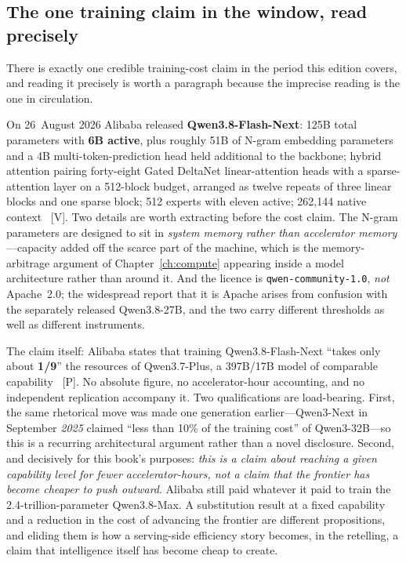 \subsection{The one training claim in the window, read precisely}

There is exactly one credible training-cost claim in the period this edition covers, and reading it precisely is worth a paragraph because the imprecise reading is the one in circulation.

On 26~August 2026 Alibaba released \textbf{Qwen3.8-Flash-Next}: 125B total parameters with \textbf{6B active}, plus roughly 51B of N-gram embedding parameters and a 4B multi-token-prediction head held additional to the backbone; hybrid attention pairing forty-eight Gated DeltaNet linear-attention heads with a sparse-attention layer on a 512-block budget, arranged as twelve repeats of three linear blocks and one sparse block; 512 experts with eleven active; 262,144 native context~\cite{qwen38-flash-next} [V]. Two details are worth extracting before the cost claim. The N-gram parameters are designed to sit in \emph{system memory rather than accelerator memory}---capacity added off the scarce part of the machine, which is the memory-arbitrage argument of Chapter~\ref{ch:compute} appearing inside a model architecture rather than around it. And the licence is \texttt{qwen-community-1.0}, \emph{not} Apache~2.0; the widespread report that it is Apache arises from confusion with the separately released Qwen3.8-27B, and the two carry different thresholds as well as different instruments.

The claim itself: Alibaba states that training Qwen3.8-Flash-Next ``takes only about \textbf{1/9}'' the resources of Qwen3.7-Plus, a 397B/17B model of comparable capability~\cite{qwen-training-ninth} [P]. No absolute figure, no accelerator-hour accounting, and no independent replication accompany it. Two qualifications are load-bearing. First, the same rhetorical move was made one generation earlier---Qwen3-Next in September \emph{2025} claimed ``less than 10\% of the training cost'' of Qwen3-32B---so this is a recurring architectural argument rather than a novel disclosure. Second, and decisively for this book's purposes: \emph{this is a claim about reaching a given capability level for fewer accelerator-hours, not a claim that the frontier has become cheaper to push outward}. Alibaba still paid whatever it paid to train the 2.4-trillion-parameter Qwen3.8-Max. A substitution result at a fixed capability and a reduction in the cost of advancing the frontier are different propositions, and eliding them is how a serving-side efficiency story becomes, in the retelling, a claim that intelligence itself has become cheap to create.

